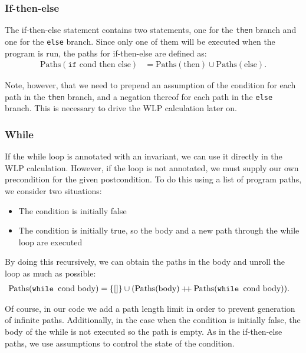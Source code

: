 \documentclass[a4paper]{article}
\newcommand\mdoubleplus{\ensuremath{\mathbin{+\mkern-5mu+}}}
\begin{document}
\subsubsection*{If-then-else}

The if-then-else statement contains two statements, one for the \texttt{then} branch
and one for the \texttt{else} branch. Since only one of them will be executed
when the program is run, the paths for if-then-else are defined as:
\begin{align*}
	\text{Paths}(\texttt{if } \text{cond } \text{then } \text{else}) &= \text{Paths}(\text{then}) \cup \text{Paths}(\text{else}).
\end{align*}

Note, however, that we need to prepend an assumption of the condition for each
path in the \texttt{then} branch, and a negation thereof for each path in the
\texttt{else} branch. This is necessary to drive the WLP calculation later on.

\subsubsection*{While}

If the while loop is annotated with an invariant, we can use it directly in the
WLP calculation. However, if the loop is not annotated, we must supply our own
precondition for the given postcondition. To do this using a list of program
paths, we consider two situations:

\begin{itemize}
\item The condition is initially false
\item The condition is initially true, so the body and a new path through
the while loop are executed
\end{itemize}

By doing this recursively, we can obtain the paths in the body and unroll the
loop as much as possible:
\begin{align*}
	\text{Paths}(\texttt{while } \text{cond } \text{body}) &= \{[]\} \cup (\text{Paths}(\text{body}) \mdoubleplus \text{Paths}(\texttt{while } \text{cond } \text{body}) ).
\end{align*}

Of course, in our code we add a path length limit in order to prevent generation
of infinite paths. Additionally, in the case when the condition is initially false,
the body of the while is not executed so the path is empty. As in the
if-then-else paths, we use assumptions to control the state of the condition.
\end{document}
